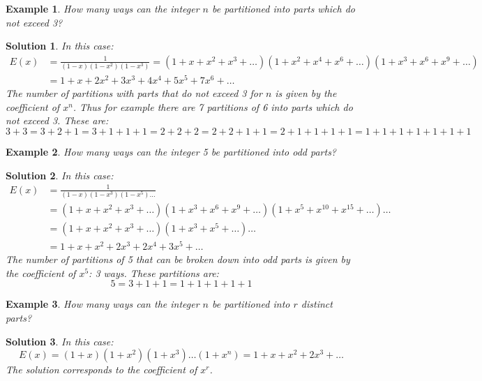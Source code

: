 \documentclass[12pt, letterpaper, onecolumn, conference, final]{IEEEtran}
\theoremstyle{definition}
\theoremstyle{plain}
\newtheorem{example}{Example}[section]
\newtheorem{solution}{Solution}[section]
\begin{document}
\begin{example}
How many ways can the integer $n$ be partitioned into parts which do not exceed 3?
\end{example}
\begin{solution}
In this case:
\begin{equation*}
\begin{split}
E(x) &= \frac{1}{(1-x)(1-x^2)(1-x^3)} = (1 + x + x^2 + x^3 + \dots)(1 + x^2 + x^4 + x^6 + \dots)(1 + x^3 + x^6 + x^9 + \dots) \\
&= 1 + x + 2x^2 + 3x^3 + 4x^4 + 5x^5 + 7x^6 + \dots
\end{split}
\end{equation*}
The number of partitions with parts that do not exceed 3 for $n$ is given by the coefficient of $x^n$. Thus for example there are 7 partitions of 6 into parts which do not exceed 3. These are:
\begin{equation*}
3 + 3 = 3 + 2 + 1 = 3 + 1 + 1 + 1 = 2 + 2 + 2 = 2 + 2 + 1 + 1 = 2 + 1 + 1 + 1 + 1 = 1 + 1 + 1 + 1 + 1 + 1 + 1
\end{equation*}
\end{solution}

\begin{example}
How many ways can the integer 5 be partitioned into odd parts?
\end{example}
\begin{solution}
In this case:
\begin{equation*}
\begin{split}
E(x) &= \frac{1}{(1-x)(1-x^3)(1-x^5)\dots} \\
&= (1 + x + x^2 + x^3 + \dots)(1 + x^3 + x^6 + x^9 + \dots)(1 + x^5 + x^{10} + x^{15} + \dots)\dots \\
&= (1 + x + x^2 + x^3 + \dots)(1 + x^3 + x^5 + \dots)\dots \\
&= 1 + x + x^2 + 2x^3 + 2x^4 + 3x^5 + \dots
\end{split}
\end{equation*}
The number of partitions of 5 that can be broken down into odd parts is given by the coefficient of $x^5$: 3 ways. These partitions are:
\begin{equation*}
5 = 3 + 1 + 1 = 1 + 1 + 1 + 1 + 1
\end{equation*}
\end{solution}

\begin{example}
How many ways can the integer $n$ be partitioned into $r$ distinct parts?
\end{example}
\begin{solution}
In this case:
\begin{equation*}
E(x) = (1+x)(1+x^2)(1+x^3)\dots(1+x^n) = 1 + x + x^2 + 2x^3 + \dots
\end{equation*}
The solution corresponds to the coefficient of $x^r$.
\end{solution}
\end{document}
